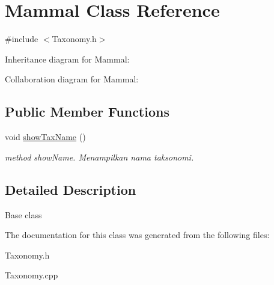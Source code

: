 \hypertarget{classMammal}{}\section{Mammal Class Reference}
\label{classMammal}


{\ttfamily \#include $<$Taxonomy.\+h$>$}



Inheritance diagram for Mammal\+:


Collaboration diagram for Mammal\+:
\subsection*{Public Member Functions}
\begin{DoxyCompactItemize}
\item 
void \hyperlink{classMammal_a339b8cfa7a68fd1df89bce06c24e62ff}{show\+Tax\+Name} ()\hypertarget{classMammal_a339b8cfa7a68fd1df89bce06c24e62ff}{}\label{classMammal_a339b8cfa7a68fd1df89bce06c24e62ff}

\begin{DoxyCompactList}\small\item\em method show\+Name. Menampilkan nama taksonomi. \end{DoxyCompactList}\end{DoxyCompactItemize}


\subsection{Detailed Description}
Base class 

The documentation for this class was generated from the following files\+:\begin{DoxyCompactItemize}
\item 
Taxonomy.\+h\item 
Taxonomy.\+cpp\end{DoxyCompactItemize}
